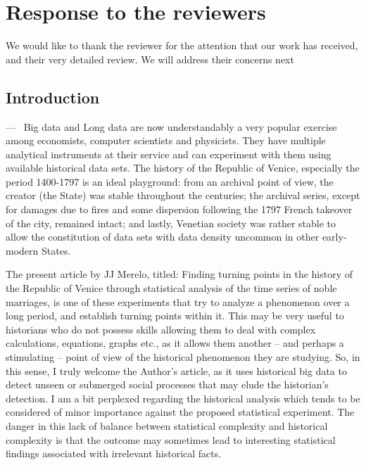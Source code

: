 \documentclass[11pt]{article}
\newcounter{reviewer}
\newcounter{point}[reviewer]
\renewcommand{\thepoint}{P\,\thereviewer.\arabic{point}}
\newenvironment{point}
   {\refstepcounter{point} \bigskip \noindent {\textbf{Reviewer~Point~\thepoint} } ---\ }
   {\par }
\begin{document}
\section*{Response to the reviewers}

We would like to thank the reviewer for the attention that our work has
received, and their very detailed review. We will address their concerns next


\subsection{Introduction}

\begin{point}
  Big data and Long data are now understandably a very popular exercise among
  economists, computer scientists and physicists. They have multiple analytical
  instruments at their service and can experiment with them using available
  historical data sets. The history of the Republic of Venice, especially the
  period 1400-1797 is an ideal playground: from an archival point of view, the
  creator (the State) was stable throughout the centuries; the archival series,
  except for damages due to fires and some dispersion following the 1797 French
  takeover of the city, remained intact; and lastly, Venetian society was rather
  stable to allow the constitution of data sets with data density uncommon in
  other early-modern States.

The present article by JJ Merelo, titled: Finding turning points in the history
of the Republic of Venice through statistical analysis of the time series of
noble marriages, is one of these experiments that try to analyze a phenomenon
over a long period, and establish turning points within it. This may be very
useful to historians who do not possess skills allowing them to deal with
complex calculations, equations, graphs etc., as it allows them another – and
perhaps a stimulating – point of view of the historical phenomenon they are
studying.  So, in this sense, I truly welcome the Author’s article, as it uses
historical big data to detect unseen or submerged social processes that may
elude the historian’s detection. I am a bit perplexed regarding the historical
analysis which tends to be considered of minor importance against the proposed
statistical experiment. The danger in this lack of balance between statistical
complexity and historical complexity is that the outcome may sometimes lead to
interesting statistical findings associated with irrelevant historical facts.
\end{point}
\end{document}
